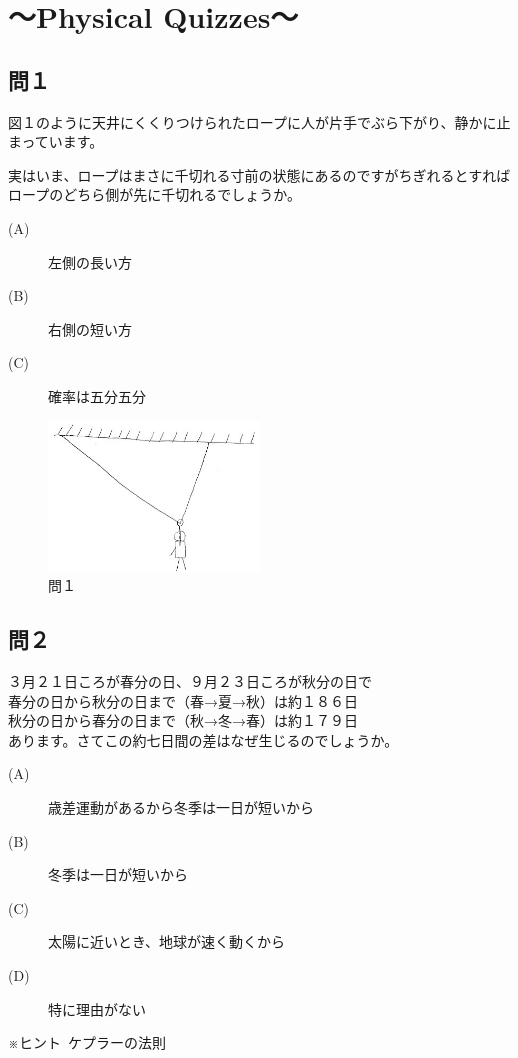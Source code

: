 \chapter{～Physical Quizzes～}

\section*{問１}
図１のように天井にくくりつけられたロープに人が片手でぶら下がり、静かに止まっています。\par
実はいま、ロープはまさに千切れる寸前の状態にあるのですがちぎれるとすればロープのどちら側が先に千切れるでしょうか。
\begin{description}
  \item[(A)] 左側の長い方
  \item[(B)] 右側の短い方
  \item[(C)] 確率は五分五分
\end{description}
\begin{figure}[H]
  \centering
  \includegraphics[height=4cm,clip]{nishimura/image/toi1.jpg}
  \caption{問１}
  \label{fig:toi1}
\end{figure}

\newpage
\section*{問２}
３月２１日ころが春分の日、９月２３日ころが秋分の日で\\
春分の日から秋分の日まで（春→夏→秋）は約１８６日\\
秋分の日から春分の日まで（秋→冬→春）は約１７９日\\
あります。さてこの約七日間の差はなぜ生じるのでしょうか。

\begin{description}
  \item[(A)] 歳差運動があるから冬季は一日が短いから
  \item[(B)] 冬季は一日が短いから
  \item[(C)] 太陽に近いとき、地球が速く動くから
  \item[(D)] 特に理由がない
\end{description}
※ヒント\ ケプラーの法則

